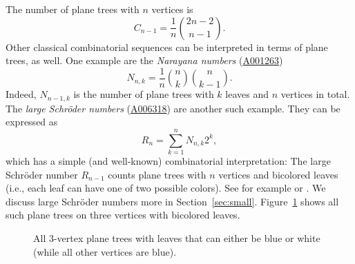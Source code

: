 \documentclass[12pt]{amsart}
\newcommand{\seqnum}[1]{\href{https://oeis.org/#1}{#1}}
\begin{document}
The number of plane trees with $n$ vertices is
$$C_{n-1} = \frac{1}{n} \binom{2n-2}{n-1}.$$
Other classical combinatorial sequences can be interpreted in terms of plane trees, as well. One example are the \emph{Narayana numbers} (\seqnum{A001263})
$$N_{n,k} = \frac{1}{n} \binom{n}{k} \binom{n}{k-1}.$$
Indeed, $N_{n-1,k}$ is the number of plane trees with $k$ leaves and $n$ vertices in total. The \emph{large Schr\"oder numbers} (\seqnum{A006318}) are another such example. They can be expressed as
\begin{equation}\label{eq:schroder}
R_n = \sum_{k=1}^n N_{n,k} 2^k,
\end{equation}
which has a simple (and well-known) combinatorial interpretation: The large Schr\"oder number $R_{n-1}$ counts plane trees with $n$ vertices and bicolored leaves (i.e., each leaf can have one of two possible colors). See for example \cite[Theorem 3.5]{CLS2007Butterfly} or \cite[Example 18]{Barry2016Riordan}. We discuss large Schr\"oder numbers more in Section~\ref{sec:small}. Figure~\ref{fig:Schr-3} shows all such plane trees on three vertices with bicolored leaves.
\begin{figure}[htbp]
\caption{All $3$-vertex plane trees with leaves that can either be blue or white (while all other vertices are blue).}\label{fig:Schr-3}
\end{figure}
\end{document}
